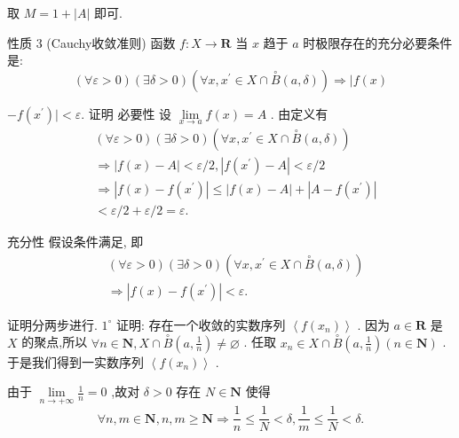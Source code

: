 取 $M = 1 + \left| A\right|$ 即可.

性质 3 (Cauchy收敛准则) 函数 $f : X \rightarrow  \mathbf{R}$ 当 $x$ 趋于 $a$ 时极限存在的充分必要条件是:
$$\left( {\forall \varepsilon  > 0}\right) \left( {\exists \delta  > 0}\right) \left( {\forall x,{x}^{\prime } \in  X \cap  \overset{ \circ  }{B}\left( {a,\delta }\right) }\right)  \Rightarrow   \mid  f\left( x\right)$$

$- f\left( {x}^{\prime }\right)  \mid   < \varepsilon .$ 证明 必要性 设 $\mathop{\lim }\limits_{{x \rightarrow  a}}f\left( x\right)  = A$ . 由定义有
\begin{align*}
	&\left( {\forall \varepsilon  > 0}\right) \left( {\exists \delta  > 0}\right) \left( {\forall x,{x}^{\prime } \in  X \cap  \overset{ \circ  }{B}\left( {a,\delta }\right) }\right)\\
	&\Rightarrow  \left| {f\left( x\right)  - A}\right|  < \varepsilon /2,\left| {f\left( {x}^{\prime }\right)  - A}\right|  < \varepsilon /2\\
	&\Rightarrow  \left| {f\left( x\right)  - f\left( {x}^{\prime }\right) }\right|  \leq  \left| {f\left( x\right)  - A}\right|  + \left| {A - f\left( {x}^{\prime }\right) }\right|\\
	&< \varepsilon /2 + \varepsilon /2 = \varepsilon .
\end{align*}

充分性 假设条件满足, 即
\begin{align*}
	&\left( {\forall \varepsilon  > 0}\right) \left( {\exists \delta  > 0}\right) \left( {\forall x,{x}^{\prime } \in  X \cap  \overset{ \circ  }{B}\left( {a,\delta }\right) }\right)\\
	&\Rightarrow  \left| {f\left( x\right)  - f\left( {x}^{\prime }\right) }\right|  < \varepsilon .
\end{align*}

证明分两步进行. ${1}^{ \circ  }$ 证明: 存在一个收敛的实数序列 $\left\langle  {f\left( {x}_{n}\right) }\right\rangle$ . 因为 $a \in  \mathbf{R}$ 是 $X$ 的聚点,所以 $\forall n \in  \mathbf{N},X \cap  \overset{ \circ  }{B}\left( {a,\frac{1}{n}}\right)  \neq  \varnothing$ . 任取 ${x}_{n} \in  X \cap  \overset{ \circ  }{B}\left( {a,\frac{1}{n}}\right) \left( {n \in  \mathbf{N}}\right)$ . 于是我们得到一实数序列 $\left\langle  {f\left( {x}_{n}\right) }\right\rangle$ .

由于 $\mathop{\lim }\limits_{{n \rightarrow   + \infty }}\frac{1}{n} = 0$ ,故对 $\delta  > 0$ 存在 $N \in  \mathbf{N}$ 使得
$$\forall n,m \in  \mathbf{N},n,m \geq  \mathbf{N} \Rightarrow  \frac{1}{n} \leq  \frac{1}{N} < \delta ,\frac{1}{m} \leq  \frac{1}{N} < \delta .$$

